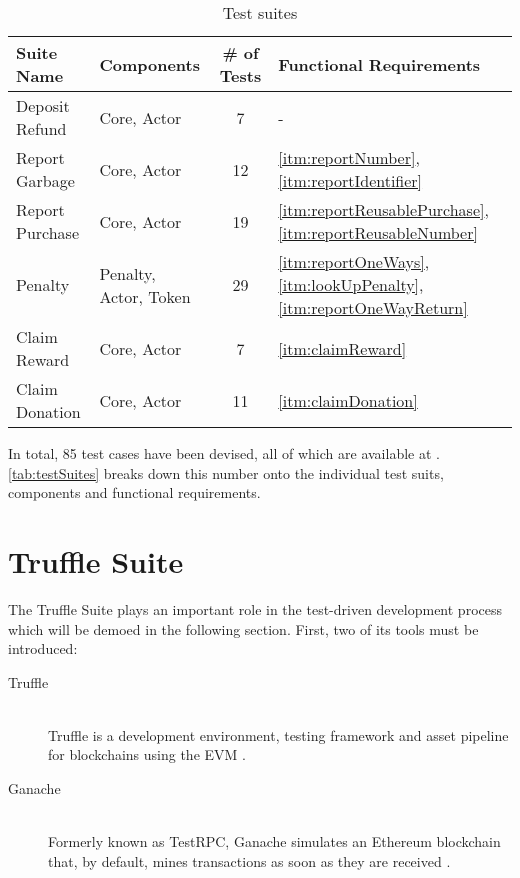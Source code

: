 \begin{table}[hbt]
	\centering
  	\begin{tabular}{l|l|c|l}
	    Suite Name & Components & \# of Tests & Functional Requirements \\
	    \hline
	    Deposit Refund & Core, Actor & 7 & - \\
	    Report Garbage & Core, Actor & 12 & \ref{itm:reportNumber}, \ref{itm:reportIdentifier} \\
	    Report Purchase & Core, Actor & 19 & \ref{itm:reportReusablePurchase}, \ref{itm:reportReusableNumber} \\
		Penalty & Penalty, Actor, Token & 29 & \ref{itm:reportOneWays}, \ref{itm:lookUpPenalty}, \ref{itm:reportOneWayReturn} \\ 
		Claim Reward & Core, Actor & 7 & \ref{itm:claimReward} \\
		Claim Donation & Core, Actor & 11 & \ref{itm:claimDonation} \\
  	\end{tabular}
  	\caption{Test suites}
  	\label{tab:testSuites}
\end{table}

\FloatBarrier

In total, 85 test cases have been devised, all of which are available at \cite{depositRefundGitHub}. \autoref{tab:testSuites} breaks down this number onto the individual test suits, components and functional requirements.

\pagebreak

\section{Truffle Suite}
The Truffle Suite plays an important role in the test-driven development process which will be demoed in the following section. First, two of its tools must be introduced:

\begin{description}
  \item[Truffle]
  \hfill \\
  Truffle is a development environment, testing framework and asset pipeline for blockchains using the \ac{EVM} \cite[Truffle Overview]{truffleSuite}.
  \item[Ganache]
  \hfill \\
  Formerly known as TestRPC, Ganache simulates an Ethereum blockchain that, by default, mines transactions as soon as they are received \cite[Ganache Quickstart]{truffleSuite}. 
\end{description}


